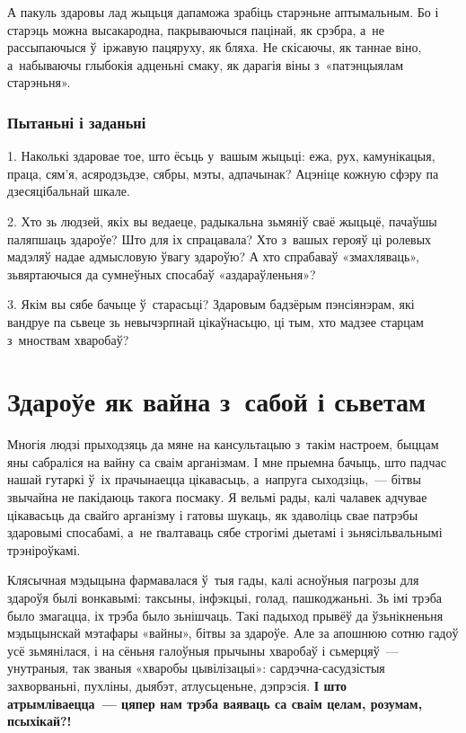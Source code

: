 А пакуль здаровы лад жыцьця дапаможа зрабіць старэньне аптымальным. Бо і старэць можна высакародна, пакрываючыся пацінай, як срэбра, а~не рассыпаючыся ў~іржавую пацяруху, як бляха. Не скісаючы, як таннае віно, а~набываючы глыбокія адценьні смаку, як дарагія віны з~«патэнцыялам старэньня». 


\subsubsection{Пытаньні і заданьні}

1. Наколькі здаровае тое, што ёсьць у~вашым жыцьці: ежа, рух, камунікацыя, праца, сям'я, асяродзьдзе, сябры, мэты, адпачынак? Ацэніце кожную сфэру па дзесяцібальнай шкале.

2. Хто зь людзей, якіх вы ведаеце, радыкальна зьмяніў сваё жыцьцё, пачаўшы паляпшаць здароўе? Што для іх спрацавала? Хто з~вашых герояў ці ролевых мадэляў надае адмысловую ўвагу здароўю? А хто спрабаваў «змахляваць», зьвяртаючыся да сумнеўных спосабаў «аздараўленьня»?

3. Якім вы сябе бачыце ў~старасьці? Здаровым бадзёрым пэнсіянэрам, які вандруе па сьвеце зь невычэрпнай цікаўнасьцю, ці тым, хто мадзее старцам з~мноствам хваробаў?


\section{Здароўе як вайна з~сабой і сьветам}


Многія людзі прыходзяць да мяне на кансультацыю з~такім настроем, быццам яны сабраліся на вайну са сваім арганізмам. І мне прыемна бачыць, што падчас нашай гутаркі ў~іх прачынаецца цікавасьць, а~напруга сыходзіць,~--- бітвы звычайна не пакідаюць такога посмаку. Я вельмі рады, калі чалавек адчувае цікавасьць да свайго арганізму і гатовы шукаць, як здаволіць свае патрэбы здаровымі спосабамі, а~не ґвалтаваць сябе строгімі дыетамі і зьнясільвальнымі трэніроўкамі.

Клясычная мэдыцына фармавалася ў~тыя гады, калі асноўныя пагрозы для здароўя былі вонкавымі: таксыны, інфэкцыі, голад, пашкоджаньні. Зь імі трэба было змагацца, іх трэба было зьнішчаць. Такі падыход прывёў да ўзьнікненьня мэдыцынскай мэтафары «вайны», бітвы за здароўе. Але за апошнюю сотню гадоў усё зьмянілася, і на сёньня галоўныя прычыны хваробаў і сьмерцяў~--- унутраныя, так званыя «хваробы цывілізацыі»: сардэчна-сасудзістыя захворваньні, пухліны, дыябэт, атлусьценьне, дэпрэсія. \textbf{І што атрымліваецца~--- цяпер нам трэба ваяваць са сваім целам, розумам, псыхікай?!}

